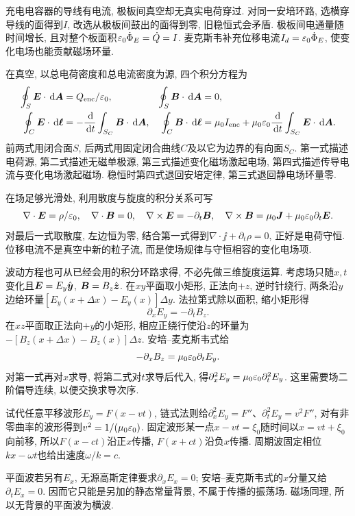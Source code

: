 \label{ch:maxwell}
充电电容器的导线有电流, 极板间真空却无真实电荷穿过. 对同一安培环路, 选横穿导线的面得到$I$, 改选从极板间鼓出的面得到零, 旧稳恒式会矛盾. 极板间电通量随时间增长, 且对整个板面积$\varepsilon_0\dot\Phi_E=\dot Q=I$. 麦克斯韦补充位移电流$I_d=\varepsilon_0\dot\Phi_E$, 使变化电场也能贡献磁场环量.

在真空, 以总电荷密度和总电流密度为源, 四个积分方程为
\begin{align}
\oint_S\boldsymbol{E}\cdot\,\mathrm d\boldsymbol{A}&=Q_{\rm enc}/\varepsilon_0,&\oint_S\boldsymbol{B}\cdot\,\mathrm d\boldsymbol{A}&=0,\nonumber\\
\oint_C\boldsymbol{E}\cdot\,\mathrm d\boldsymbol{\ell}&=-\frac{\,\mathrm d}{\,\mathrm d t}\int_{S_C}\boldsymbol{B}\cdot\,\mathrm d\boldsymbol{A},&
\oint_C\boldsymbol{B}\cdot\,\mathrm d\boldsymbol{\ell}&=\mu_0I_{\rm enc}+\mu_0\varepsilon_0\frac{\,\mathrm d}{\,\mathrm d t}\int_{S_C}\boldsymbol{E}\cdot\,\mathrm d\boldsymbol{A}.\label{eq:maxwell}
\end{align}
前两式用闭合面$S$, 后两式用固定闭合曲线$C$及以它为边界的有向面$S_C$. 第一式描述电荷源, 第二式描述无磁单极源, 第三式描述变化磁场激起电场, 第四式描述传导电流与变化电场激起磁场. 稳恒时第四式退回安培定律, 第三式退回静电场环量零.

在场足够光滑处, 利用散度与旋度的积分关系可写
\[
\nabla\cdot\boldsymbol{E}=\rho/\varepsilon_0,\quad\nabla\cdot\boldsymbol{B}=0,\quad
\nabla\times\boldsymbol{E}=-\partial_t\boldsymbol{B},\quad\nabla\times\boldsymbol{B}=\mu_0\boldsymbol{J}+\mu_0\varepsilon_0\partial_t\boldsymbol{E}.
\]
对最后一式取散度, 左边恒为零, 结合第一式得到$\nabla\cdot\jj+\partial_t\rho=0$, 正好是电荷守恒. 位移电流不是真空中新的粒子流, 而是使场规律与守恒相容的变化电场项.

波动方程也可从已经会用的积分环路求得, 不必先做三维旋度运算. 考虑场只随$x,t$变化且$\boldsymbol{E}=E_y\hat{\boldsymbol{y}}$, $\boldsymbol{B}=B_z\hat{\boldsymbol{z}}$. 在$xy$平面取小矩形, 正法向$+z$, 逆时针绕行, 两条沿$y$边给环量$[E_y(x+\Delta x)-E_y(x)]\Delta y$. 法拉第式除以面积, 缩小矩形得
\[
\partial_xE_y=-\partial_tB_z.
\]
在$xz$平面取正法向$+y$的小矩形, 相应正绕行使沿$z$的环量为$-[B_z(x+\Delta x)-B_z(x)]\Delta z$. 安培--麦克斯韦式给
\[
-\partial_xB_z=\mu_0\varepsilon_0\partial_tE_y.
\]
对第一式再对$x$求导, 将第二式对$t$求导后代入, 得$\partial_x^2E_y=\mu_0\varepsilon_0\partial_t^2E_y$. 这里需要场二阶偏导连续, 以便交换求导次序.

试代任意平移波形$E_y=F(x-vt)$, 链式法则给$\partial_x^2E_y=F''$、$\partial_t^2E_y=v^2F''$, 对有非零曲率的波形得到$v^2=1/(\mu_0\varepsilon_0)$. 固定波形某一点$x-vt=\xi_0$随时间以$x=vt+\xi_0$向前移, 所以$F(x-ct)$沿正$x$传播, $F(x+ct)$沿负$x$传播. 周期波固定相位$kx-\omega t$也给出速度$\omega/k=c$.

平面波若另有$E_x$, 无源高斯定律要求$\partial_xE_x=0$; 安培--麦克斯韦式的$x$分量又给$\partial_tE_x=0$. 因而它只能是另加的静态常量背景, 不属于传播的振荡场. 磁场同理, 所以无背景的平面波为横波.

